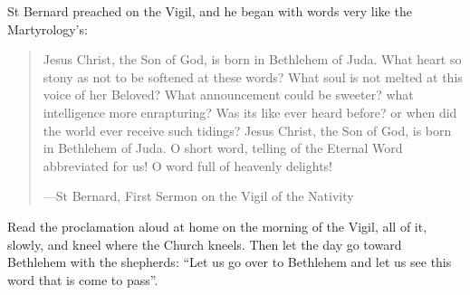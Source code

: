 St Bernard preached on the Vigil, and he began with words very like the
Martyrology's:

\begin{quote}
Jesus Christ, the Son of God, is born in Bethlehem of Juda. What heart so stony
as not to be softened at these words? What soul is not melted at this voice of
her Beloved? What announcement could be sweeter? what intelligence more
enrapturing? Was its like ever heard before? or when did the world ever receive
such tidings? Jesus Christ, the Son of God, is born in Bethlehem of Juda. O
short word, telling of the Eternal Word abbreviated for us! O word full of
heavenly delights!\par
{\smallskip\noindent\small ---St Bernard, First Sermon on the Vigil of the Nativity\par}
\end{quote}

Read the proclamation aloud at home on the morning of the Vigil, all of it,
slowly, and kneel where the Church kneels. Then let the day go toward
Bethlehem with the shepherds: ``Let us go over to Bethlehem and let us see this
word that is come to pass''.

